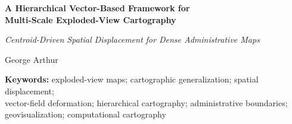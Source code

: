 \documentclass[12pt, a4paper]{article}
\numberwithin{equation}{section}
\begin{document}
\begin{titlepage}
  \centering
  \vspace*{2cm}
  {\LARGE\bfseries A Hierarchical Vector-Based Framework for\\[4pt]
   Multi-Scale Exploded-View Cartography\par}
  \vspace{0.8cm}
  {\large\itshape Centroid-Driven Spatial Displacement for Dense Administrative Maps\par}
  \vspace{1.2cm}
  {\large George Arthur\par}
  \vspace{1cm}
  {\small
  \textbf{Keywords:} exploded-view maps; cartographic generalization; spatial displacement;\\
  vector-field deformation; hierarchical cartography; administrative boundaries;\\
  geovisualization; computational cartography\par}
  \vfill
\end{titlepage}
\end{document}
